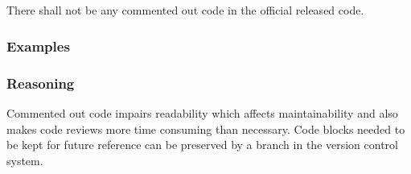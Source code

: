 \subsection*{\codingRule{}}

There shall not be any commented out code in the official released code.

\subsubsection*{Examples}

\noindent
\begin{minipage}[t]{\codelstwidth\linewidth}
    
\end{minipage}
\hfill
\begin{minipage}[t]{\codelstwidth\linewidth}
    
\end{minipage}

\subsubsection*{Reasoning}

Commented out code impairs readability which affects maintainability and also makes code reviews more time consuming than necessary. Code blocks needed to be kept for future reference can be preserved by a branch in the version control system.
